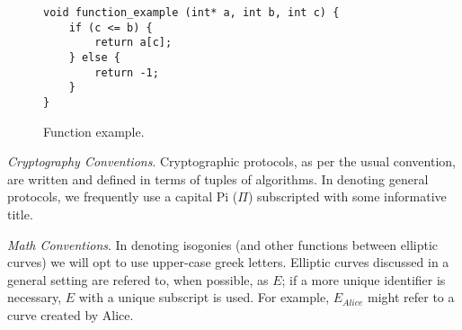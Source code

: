 \begin{figure}[!h]
\label{code:pbinv}
\begin{lstlisting}
void function_example (int* a, int b, int c) {
	if (c <= b) {
		return a[c];
	} else {
		return -1;
	}
}
\end{lstlisting}
\caption{Function example.}
\end{figure}

\noindent
\textit{Cryptography Conventions}. Cryptographic protocols, as per the usual convention, are written and defined in terms of tuples of algorithms. In denoting general protocols, we frequently use a capital Pi ($\Pi$) subscripted with some informative title.

\noindent
\textit{Math Conventions}. In denoting isogonies (and other functions between elliptic curves) we will opt to use upper-case greek letters. Elliptic curves discussed in a general setting are refered to, when possible, as $E$; if a more unique identifier is necessary, $E$ with a unique subscript is used. For example, $E_{Alice}$ might refer to a curve created by Alice.  


